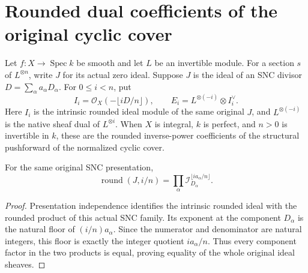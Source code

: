 \section{Rounded dual coefficients of the original cyclic cover}

Let $f:X\to\operatorname{Spec}k$ be smooth and let $L$ be an invertible
module.  For a section $s$ of $L^{\otimes n}$, write $J$ for its actual
zero ideal.  Suppose $J$ is the ideal of an SNC divisor
$D=\sum_\alpha a_\alpha D_\alpha$.  For $0\le i<n$, put
\[
 I_i=\mathcal O_X(-\lfloor iD/n\rfloor),\qquad
 E_i=L^{\otimes(-i)}\otimes I_i^\vee.
\]
Here $I_i$ is the intrinsic rounded ideal module of the same original
$J$, and $L^{\otimes(-i)}$ is the native sheaf dual of $L^{\otimes i}$.
When $X$ is integral, $k$ is perfect, and $n>0$ is invertible in $k$,
these are the rounded inverse-power coefficients of the structural
pushforward of the normalized cyclic cover.

\begin{lemma}
\label{lem:kn-nadel-cyclic-rounded-product}
\leanok
{}
For the same original SNC presentation,
\[
 \operatorname{round}(J,i/n)
 =\prod_\alpha \mathcal I_{D_\alpha}^{\lfloor ia_\alpha/n\rfloor}.
\]
\end{lemma}
\begin{proof}
Presentation independence identifies the intrinsic rounded ideal with
the rounded product of this actual SNC family.  Its exponent at the
component $D_\alpha$ is the natural floor of $(i/n)a_\alpha$.
Since the numerator and denominator are natural integers, this floor
is exactly the integer quotient $ia_\alpha/n$.  Thus every component
factor in the two products is equal, proving equality of the whole
original ideal sheaves.
\end{proof}

